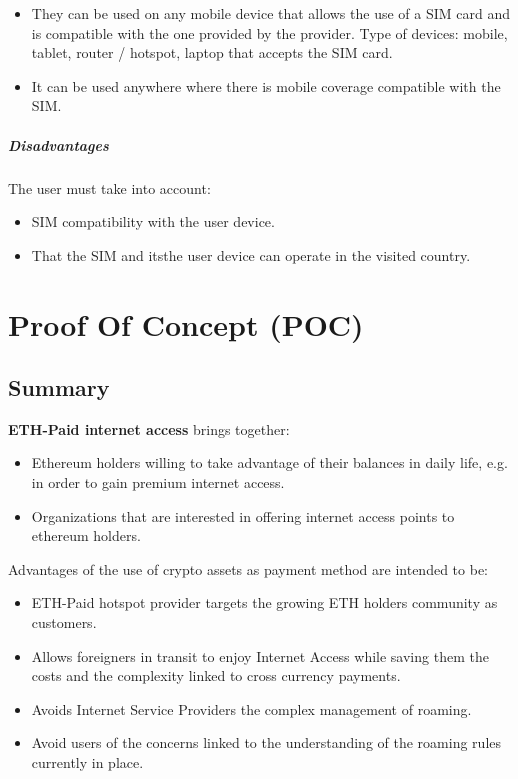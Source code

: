 \documentclass[12pt]{report}
\begin{document}
  \begin{itemize}
    \item They can be used on any mobile device that allows the use of a SIM card and is compatible with the one provided by the provider. Type of devices: mobile, tablet, router / hotspot, laptop that accepts the SIM card.
    \item It can be used anywhere where there is mobile coverage compatible with the SIM.
  \end{itemize}


  \paragraph*{Disadvantages}

  The user must take into account:

  \begin{itemize}
    \item SIM compatibility with the user device.
    \item That the SIM and itsthe user device can operate in the visited country.
  \end{itemize}

  \chapter{Proof Of Concept (POC)} \label{sec:poc}

  \section{Summary}\label{sec:poc-summary}

  \textbf{ETH-Paid internet access} brings together:

  \begin{itemize}
    \item Ethereum holders willing to take advantage of their balances in daily life, e.g. in order to gain premium internet access.
    \item Organizations that are interested in offering internet access points
  to ethereum holders.
  \end{itemize}



  Advantages of the use of crypto assets as payment method are intended to be:
  \begin{itemize}
    \item ETH-Paid hotspot provider targets the growing ETH holders community  as customers.
    \item Allows foreigners in transit to enjoy Internet Access while saving them the costs and the complexity linked to cross currency payments.
    \item Avoids Internet Service Providers the complex management of roaming.
    \item Avoid users of the concerns linked to the understanding of the roaming rules currently in place.
  \end{itemize}
\end{document}
